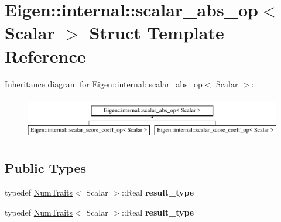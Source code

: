 \hypertarget{struct_eigen_1_1internal_1_1scalar__abs__op}{}\section{Eigen\+:\+:internal\+:\+:scalar\+\_\+abs\+\_\+op$<$ Scalar $>$ Struct Template Reference}
\label{struct_eigen_1_1internal_1_1scalar__abs__op}
Inheritance diagram for Eigen\+:\+:internal\+:\+:scalar\+\_\+abs\+\_\+op$<$ Scalar $>$\+:\begin{figure}[H]
\begin{center}
\leavevmode
\includegraphics[height=1.879195cm]{struct_eigen_1_1internal_1_1scalar__abs__op}
\end{center}
\end{figure}
\subsection*{Public Types}
\begin{DoxyCompactItemize}
\item 
\mbox{\label{struct_eigen_1_1internal_1_1scalar__abs__op_a0ba5cca2271250a406faf6f1ca904450}} 
typedef \hyperlink{group___core___module_struct_eigen_1_1_num_traits}{Num\+Traits}$<$ Scalar $>$\+::Real {\bfseries result\+\_\+type}
\item 
\mbox{\label{struct_eigen_1_1internal_1_1scalar__abs__op_a0ba5cca2271250a406faf6f1ca904450}} 
typedef \hyperlink{group___core___module_struct_eigen_1_1_num_traits}{Num\+Traits}$<$ Scalar $>$\+::Real {\bfseries result\+\_\+type}
\end{DoxyCompactItemize}
